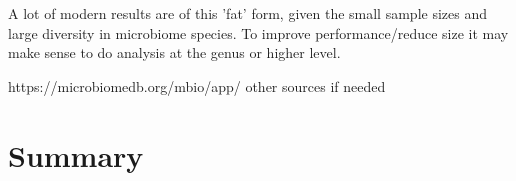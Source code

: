 A lot of modern results are of this 'fat' form, given the small sample sizes and large diversity in microbiome species. To improve performance/reduce size it may make sense to do analysis at the genus or higher level. 

https://microbiomedb.org/mbio/app/ other sources if needed





\section{Summary}

